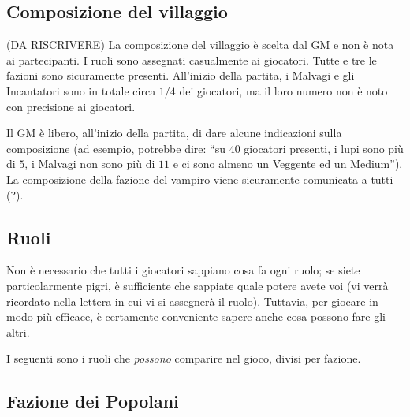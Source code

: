 \documentclass[a4paper,10pt]{article}
\begin{document}
\subsection{Composizione del villaggio}

(DA RISCRIVERE)
La composizione del villaggio è scelta dal GM e non è nota ai partecipanti. I ruoli sono assegnati casualmente ai giocatori.
Tutte e tre le fazioni sono sicuramente presenti. All'inizio della partita, i Malvagi e gli Incantatori sono in totale circa $1/4$ dei giocatori, ma il loro numero non è noto con precisione ai giocatori.

Il GM è libero, all'inizio della partita, di dare alcune indicazioni sulla composizione (ad esempio, potrebbe dire: ``su $40$ giocatori presenti, i lupi sono più di $5$, i Malvagi non sono più di $11$ e ci sono almeno un Veggente ed un Medium''). La composizione della fazione del vampiro viene sicuramente comunicata a tutti (?).


\subsection{Ruoli}

Non è necessario che tutti i giocatori sappiano cosa fa ogni ruolo; se siete particolarmente pigri, è sufficiente che sappiate quale potere avete voi (vi verrà ricordato nella lettera in cui vi si assegnerà il ruolo). Tuttavia, per giocare in modo più efficace, è certamente conveniente sapere anche cosa possono fare gli altri.


I seguenti sono i ruoli che \emph{possono} comparire nel gioco, divisi per fazione.


\subsection*{Fazione dei Popolani}
\end{document}
